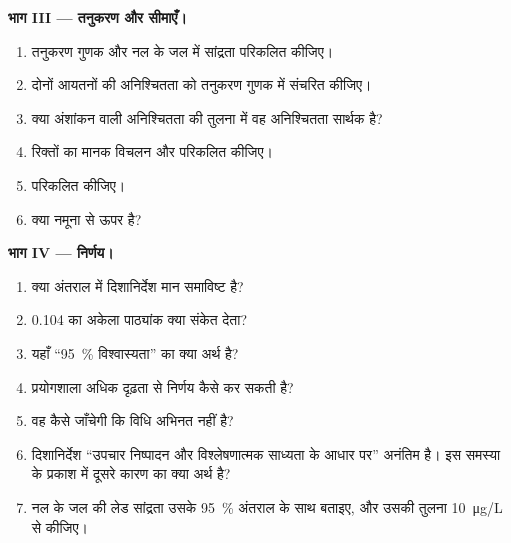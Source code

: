 \begin{problem}
\medskip
\noindent\textbf{भाग III --- तनुकरण और सीमाएँ।}
\begin{enumerate}[resume]
  \item तनुकरण गुणक और नल के जल में सांद्रता परिकलित कीजिए।
  \item दोनों आयतनों की अनिश्चितता को तनुकरण गुणक में संचरित कीजिए।
  \item क्या अंशांकन वाली अनिश्चितता की तुलना में वह अनिश्चितता सार्थक है?
  \item रिक्तों का मानक विचलन और  परिकलित कीजिए।
  \item {} परिकलित कीजिए।
  \item क्या नमूना  से ऊपर है?
\end{enumerate}

\medskip
\noindent\textbf{भाग IV --- निर्णय।}
\begin{enumerate}[resume]
  \item क्या अंतराल में दिशानिर्देश मान समाविष्ट है?
  \item 0.104 का अकेला पाठ्यांक क्या संकेत देता?
  \item यहाँ ``95~\% विश्वास्यता'' का क्या अर्थ है?
  \item प्रयोगशाला अधिक दृढ़ता से निर्णय कैसे कर सकती है?
  \item वह कैसे जाँचेगी कि विधि अभिनत नहीं है?
  \item दिशानिर्देश ``उपचार निष्पादन और विश्लेषणात्मक
        साध्यता के आधार पर'' अनंतिम है। इस समस्या के प्रकाश में दूसरे कारण का क्या अर्थ है?
  \item नल के जल की लेड सांद्रता उसके 95~\% अंतराल के साथ बताइए, और उसकी तुलना
        \qty{10}{\micro g/L} से कीजिए।
\end{enumerate}
\end{problem}
